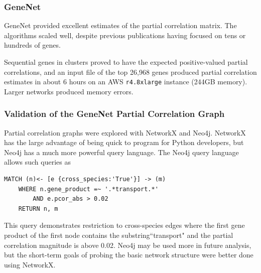 \subsubsection{GeneNet}
GeneNet provided excellent estimates of the partial correlation matrix.
The algorithms scaled well, despite previous publications having focused on tens or hundreds of genes.

Sequential genes in clusters proved to have the expected positive-valued partial correlations, and an input file of the top 26,968 genes produced partial correlation estimates in about 6 hours on an AWS \texttt{r4.8xlarge} instance (244GB memory). %
Larger networks produced memory errors.

\subsubsection{Validation of the GeneNet Partial Correlation Graph}

Partial correlation graphs were explored with NetworkX and Neo4j.
NetworkX has the large advantage of being quick to program for Python developers, but Neo4j has a much more powerful query language.
The Neo4j query language allows such queries as
\begin{verbatim}
MATCH (n)<- [e {cross_species:'True'}] -> (m)
    WHERE n.gene_product =~ '.*transport.*'
        AND e.pcor_abs > 0.02
    RETURN n, m
\end{verbatim}
This query demonstrates restriction to cross-species edges where the first gene product of the first node contains the substring``transport" and the partial correlation magnitude is above 0.02.
Neo4j may be used more in future analysis, but the short-term goals of probing the basic network structure were better done using NetworkX.

